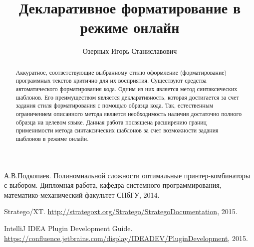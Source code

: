 
\title{Декларативное форматирование в режиме онлайн}


\author{Озерных Игорь Станиславович}



\maketitle             

\begin{abstract}
Аккуратное, соответствующие выбранному стилю оформление (форматирование)
программных текстов критично для их восприятия.
Существуют средства автоматического форматирования кода. Одним
из них является метод синтаксических шаблонов. Его преимуществом является декларативность, которая
достигается за счет задания стиля форматирования с помощью образца кода. Так, естественным ограничением
описанного метода является необходимость наличия достаточно полного образца на целевом языке.
Данная работа посвящена расширению границ применимости метода синтаксических шаблонов
за счет возможности задания шаблонов в режиме онлайн.
\end{abstract}






\begin{thebibliography}{99}
  А.В.Подкопаев. Полиномиальной сложности оптимальные принтер-комбинаторы с выбором.
  Дипломная работа, кафедра системного программирования, математико-механический факультет СПбГУ, 2014.

  Stratego/XT. \url{http://strategoxt.org/Stratego/StrategoDocumentation}, 2015.

  IntelliJ IDEA Plugin Development Guide. \url{https://confluence.jetbrains.com/display/IDEADEV/PluginDevelopment},
  2015.
\end{thebibliography}
